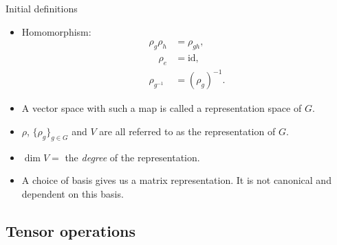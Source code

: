 \documentclass[10pt]{beamer}
\begin{document}
	\begin{frame}{Initial definitions}
		\begin{itemize}
			\item Homomorphism: \begin{align*}
				\rho_g \rho_h &= \rho_{gh}, \\
				\quad \rho_e &= \text{id}, \\
				\rho_{g^{-1}} &= (\rho_g)^{-1}.
			\end{align*}\pause
			
			\item A vector space with such a map is called a \alert{representation space of $G$}.\pause
			
			\item $\rho$, $\{\rho_g\}_{g\in G}$ and $V$ are all referred to as the \alert{representation of $G$.}\pause
			
			\item $\dim V =$ the \textit{degree} of the representation.\pause
			
			\item A choice of basis gives us a \alert{matrix representation}. It is not canonical and dependent on this basis.
		\end{itemize}		
	\end{frame}
	
	\subsection{Tensor operations}
	
\end{document}
